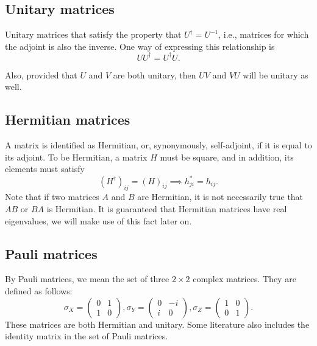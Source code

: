 \subsection{Unitary matrices}
Unitary matrices that satisfy the property that $U^\dag = U^{-1}$, i.e., matrices for which the adjoint is also the inverse. One way of expressing this relationship is 
$$U U^{\dag} = U^{\dag} U.$$

Also, provided that $U$ and $V$ are both unitary, then $UV$ and $VU$ will be unitary as well.

\subsection{Hermitian matrices}
A matrix is identified as Hermitian, or, synonymously, self-adjoint, if it is equal to its adjoint. To be Hermitian, a matrix $H$ must be square, and in addition, its elements must satisfy $$(H^{\dag})_{ij} = (H)_{ij} \implies h^{*}_{ji} = h_{ij}.$$ Note that if two matrices $A$ and $B$ are Hermitian, it is not necessarily true that $AB$ or $BA$ is Hermitian. It is guaranteed that Hermitian matrices have real eigenvalues, we will make use of this fact later on.

\subsection{Pauli matrices}\label{sec:pauli-matrices}
By Pauli matrices, we mean the set of three $2 \times 2$ complex matrices. They are defined as follows:
$$\sigma_X = \begin{pmatrix}
    0 & 1 \\
    1 & 0
\end{pmatrix}, \sigma_Y = \begin{pmatrix}
    0 & -i \\
    i & 0
\end{pmatrix}, \sigma_Z = \begin{pmatrix}
    1 & 0 \\
    0 & 1
\end{pmatrix}\text{.}$$ 
These matrices are both Hermitian and unitary. Some literature also includes the identity matrix in the set of Pauli matrices. 

